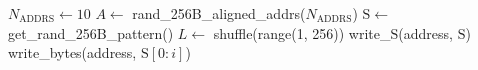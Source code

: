 \begin{algorithm}[b]
\footnotesize
\caption{redundant write test pattern generation \label{alg:red}}
\begin{algorithmic}[1]
\State $N_{\text{ADDRS}} \gets 10$
\State $A \gets$ rand\_256B\_aligned\_addrs($N_{\text{ADDRS}}$)
    \State $\mathrm{S} \gets$ get\_rand\_256B\_pattern() 
    \State $L \gets$ shuffle(range(1, 256))
    \State write\_$\mathrm{S}$(address, $\mathrm{S}$) 
        \State write\_bytes(address, $\mathrm{S}[0{:}i]$) 
    \EndFor
\EndFor
\end{algorithmic}
\end{algorithm}